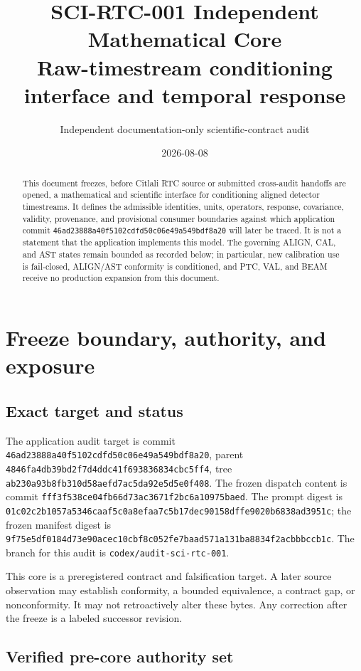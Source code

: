 \documentclass[11pt]{article}
\title{SCI-RTC-001 Independent Mathematical Core\\
Raw-timestream conditioning interface and temporal response}
\author{Independent documentation-only scientific-contract audit}
\date{2026-08-08}
\newcommand{\code}[1]{\nolinkurl{#1}}
\begin{document}
\maketitle

\begin{abstract}
This document freezes, before Citlali RTC source or submitted cross-audit
handoffs are opened, a mathematical and scientific interface for conditioning
aligned detector timestreams.  It defines the admissible identities, units,
operators, response, covariance, validity, provenance, and provisional
consumer boundaries against which application commit
\code{46ad23888a40f5102cdfd50c06e49a549bdf8a20} will later be traced.  It is
not a statement that the application implements this model.  The governing
ALIGN, CAL, and AST states remain bounded as recorded below; in particular,
new calibration use is fail-closed, ALIGN/AST conformity is conditioned, and
PTC, VAL, and BEAM receive no production expansion from this document.
\end{abstract}

\tableofcontents

\section{Freeze boundary, authority, and exposure}

\subsection{Exact target and status}

The application audit target is commit
\code{46ad23888a40f5102cdfd50c06e49a549bdf8a20}, parent
\code{4846fa4db39bd2f7d4ddc41f693836834cbc5ff4}, tree
\code{ab230a93b8fb310d58aefd7ac5da92e5d5e0f408}.  The frozen dispatch content
is commit \code{fff3f538ce04fb66d73ac3671f2bc6a10975baed}.  The prompt digest is
\code{01c02c2b1057a5346caaf5c0a8efaa7c5b17dec90158dffe9020b6838ad3951c};
the frozen manifest digest is
\code{9f75e5df0184d73e90acec10cbf8c052fe7baad571a131ba8834f2acbbbccb1c}.
The branch for this audit is \code{codex/audit-sci-rtc-001}.

This core is a preregistered contract and falsification target.  A later source
observation may establish conformity, a bounded equivalence, a contract gap,
or nonconformity.  It may not retroactively alter these bytes.  Any correction
after the freeze is a labeled successor revision.

\subsection{Verified pre-core authority set}
\end{document}
